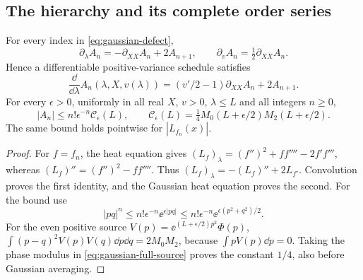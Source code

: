 \subsection{The hierarchy and its complete order series}
\begin{proposition}\label{prop:gaussian-hierarchy}
For every index in \eqref{eq:gaussian-defect},
\begin{equation}\label{eq:gaussian-hierarchy}
 \partial_\lambda A_n=-\partial_{XX}A_n+2A_{n+1},\qquad
 \partial_v A_n=\tfrac12\partial_{XX}A_n.
\end{equation}
Hence a differentiable positive-variance schedule satisfies
\begin{equation}\label{eq:gaussian-schedule}
 \frac{\dd}{\dd\lambda}A_n(\lambda,X,v(\lambda))
   =(v'/2-1)\partial_{XX}A_n+2A_{n+1}.
\end{equation}
For every \(\epsilon>0\), uniformly in all real \(X\), \(v>0\),
\(\lambda\le L\) and all integers \(n\ge0\),
\begin{equation}\label{eq:gaussian-factorial}
 |A_n|\le n!\epsilon^{-n}\mathcal C_\epsilon(L),\qquad
 \mathcal C_\epsilon(L)=\tfrac14M_0(L+\epsilon/2)M_2(L+\epsilon/2).
\end{equation}
The same bound holds pointwise for \(|L_{f_n}(x)|\).
\end{proposition}
\begin{proof}
For \(f=f_n\), the heat equation gives
\((L_f)_\lambda=(f'')^2+ff''''-2f'f'''\), whereas
\((L_f)''=(f'')^2-ff''''\). Thus
\((L_f)_\lambda=-(L_f)''+2L_{f'}\).
Convolution proves the first identity, and the Gaussian heat equation
proves the second. For the bound use
\[
 |pq|^n\le n!\epsilon^{-n}\ee^{\epsilon|pq|}
        \le n!\epsilon^{-n}\ee^{\epsilon(p^2+q^2)/2}.
\]
For the even positive source
\(V(p)=\ee^{(L+\epsilon/2)p^2}\Phi(p)\),
\(\int(p-q)^2V(p)V(q)\dd p\dd q=2M_0M_2\), because
\(\int pV(p)\dd p=0\). Taking the phase modulus in
\eqref{eq:gaussian-full-source} proves the constant \(1/4\),
also before Gaussian averaging.
\end{proof}

